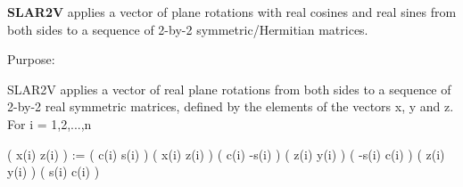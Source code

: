 {\bfseries S\+L\+A\+R2\+V} applies a vector of plane rotations with real cosines and real sines from both sides to a sequence of 2-\/by-\/2 symmetric/\+Hermitian matrices. 

 \begin{DoxyParagraph}{Purpose\+: }
\begin{DoxyVerb} SLAR2V applies a vector of real plane rotations from both sides to
 a sequence of 2-by-2 real symmetric matrices, defined by the elements
 of the vectors x, y and z. For i = 1,2,...,n

    ( x(i)  z(i) ) := (  c(i)  s(i) ) ( x(i)  z(i) ) ( c(i) -s(i) )
    ( z(i)  y(i) )    ( -s(i)  c(i) ) ( z(i)  y(i) ) ( s(i)  c(i) )\end{DoxyVerb}
 
\end{DoxyParagraph}

